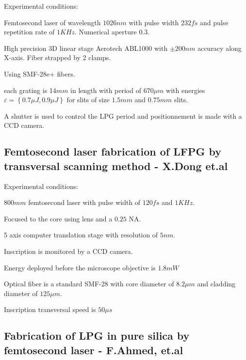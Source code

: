 \documentclass[11pt, openright]{book}
\begin{document}
     Experimental conditions:
 \begin{items}[-3pt]{-15pt}{-15pt}
    \item Femtosecond laser of wavelength $1026nm$ with pulse width $232fs$ and pulse repetition rate of $1KHz$. Numerical aperture $0.3$.
    \item High precision 3D linear stage Aerotech ABL1000 with $\pm200 nm$ accuracy along X-axis. Fiber strapped by 2 clamps.
    \item Using SMF-28e+ fibers.
    \item each grating is 14$mm$ in length with period of $670\mu m$ with energies $\varepsilon=\left\{ 0.7\mu J,0.9\mu J \right\}$ for slits of size $1.5mm$ and $0.75mm$ slits.
\end{items}

A shutter is used to control the LPG period and positionnement is made with a CCD camera.

 \subsection*{Femtosecond laser fabrication of LFPG by transversal scanning method - X.Dong et.al} 

 Experimental conditions:
  \begin{items}[-3pt]{-15pt}{-15pt}
     \item $800mm$ femtosecond laser with pulse width of $120fs$ and $1KHz$.
     \item Focused to the core using lens and a $0.25$ NA.
     \item 5 axis computer translation stage with resolution of $5nm$.
     \item Inscription is monitored by a CCD camera.
     \item Energy deployed before the microscope objective is $1.8mW$ 
     \item Optical fiber is a standard SMF-28 with core diameter of $8.2\mu m$ and cladding diameter of $125\mu m$.
     \item Inscription transversal speed is $50\mu s$
 \end{items}

  \subsection*{Fabrication of LPG in pure silica by femtosecond laser - F.Ahmed, et.al}
\end{document}
